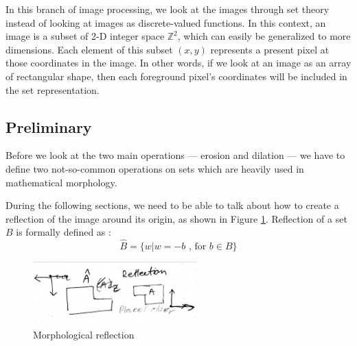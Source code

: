 \documentclass[
  digital,     %
  oneside,     %
  nosansbold,  %
  nocolorbold, %
  lof,         %
  lot,         %
]{fithesis4}
\newcommand*{\Z}{\ensuremath{\mathbb{Z}}}
\begin{document}
In this branch of image processing, we look at the images through set theory
instead of looking at images as discrete-valued functions. In this context, an
image is a subset of 2-D integer space $\Z^2$, which can easily be generalized
to more dimensions. Each element of this subset $(x, y)$ represents a present
pixel at those coordinates in the image. In other words, if we look at an image
as an array of rectangular shape, then each foreground pixel's coordinates will
be included in the set representation.

\subsection{Preliminary}
Before we look at the two main operations --- erosion and dilation --- we have to
define two not-so-common operations on sets which are heavily used in
mathematical morphology.

During the following sections, we need to be able to talk about how to create a
reflection of the image around its origin, as shown in Figure
\ref{fig:morp_refl}. Reflection  of a set $B$ is formally defined as \cite{gonzalez2002}:
$$\hat{B} = \{w | w=-b \text{ , for } b \in B\}$$
\begin{figure}
    \begin{center}
        \includegraphics[width=6.3cm]{resources/morph_reflection.jpg}
    \end{center}
    \caption{Morphological reflection} %
    \label{fig:morp_refl}
\end{figure}
\end{document}
